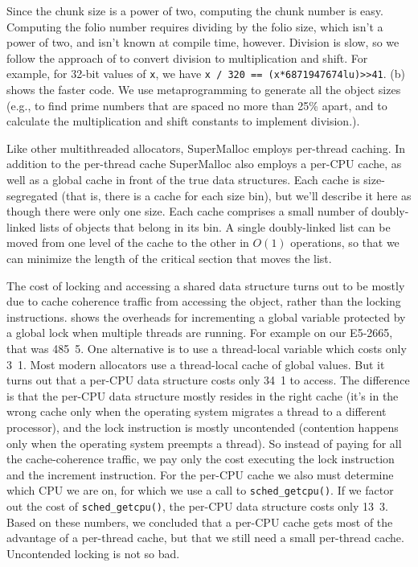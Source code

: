 \documentclass[pldi]{sigplanconf-pldi15}
\newcommand{\code}[1]{\texttt{#1}}
\begin{document}
Since the chunk size is a power of two, computing the chunk number is
easy.  Computing the folio number requires dividing by the folio size,
which isn't a power of two, and isn't known at compile time, however.
Division is slow, so we follow the approach of
\cite{MagenheimerPePe87} to convert division to multiplication and
shift.  For example, for 32-bit values of \code{x}, we have
\texttt{x / 320 == (x*6871947674lu)>>41}.  (b)
shows the faster code.  We use metaprogramming to generate all the
object sizes (e.g., to find prime numbers that are spaced no more than
25\% apart, and to calculate the multiplication and shift constants to
implement division.).


Like other multithreaded allocators, SuperMalloc employs per-thread
caching.  In addition to the per-thread cache SuperMalloc also employs
a per-CPU cache, as well as a global cache in front of the true data
structures.  Each cache is size-segregated (that is, there is a cache
for each size bin), but we'll describe it here as though there were
only one size.  Each cache comprises a small number of doubly-linked
lists of objects that belong in its bin.  A single doubly-linked list
can be moved from one level of the cache to the other in $O(1)$
operations, so that we can minimize the length of the critical section
that moves the list.

The cost of locking and accessing a shared data structure turns out to
be mostly due to cache coherence traffic from accessing the object,
rather than the locking instructions.   shows the
overheads for incrementing a global variable protected by a global
lock when multiple threads are running.  For example on our E5-2665,
that was \unit{485.5}\nano\second.  One alternative is to use a
thread-local variable which costs only \unit{3.1}\nano\second.  Most modern
allocators use a thread-local cache of global values.  But it turns
out that a per-CPU data structure costs only \unit{34.1}\nano\second{}
to access.  The difference is that the per-CPU data structure mostly
resides in the right cache (it's in the wrong cache only when the
operating system migrates a thread to a different processor), and the
lock instruction is mostly uncontended (contention happens only when
the operating system preempts a thread).  So instead of paying for all
the cache-coherence traffic, we pay only the cost executing the lock
instruction and the increment instruction.  For the per-CPU cache we
also must determine which CPU we are on, for which we use a call to
\code{sched_getcpu()}.  If we factor out the cost of
\code{sched_getcpu()}, the per-CPU data structure costs only
\unit{13.3}\nano\second.  Based on these numbers, we concluded that a
per-CPU cache gets most of the advantage of a per-thread cache, but
that we still need a small per-thread cache.  Uncontended locking is
not so bad.
\end{document}
